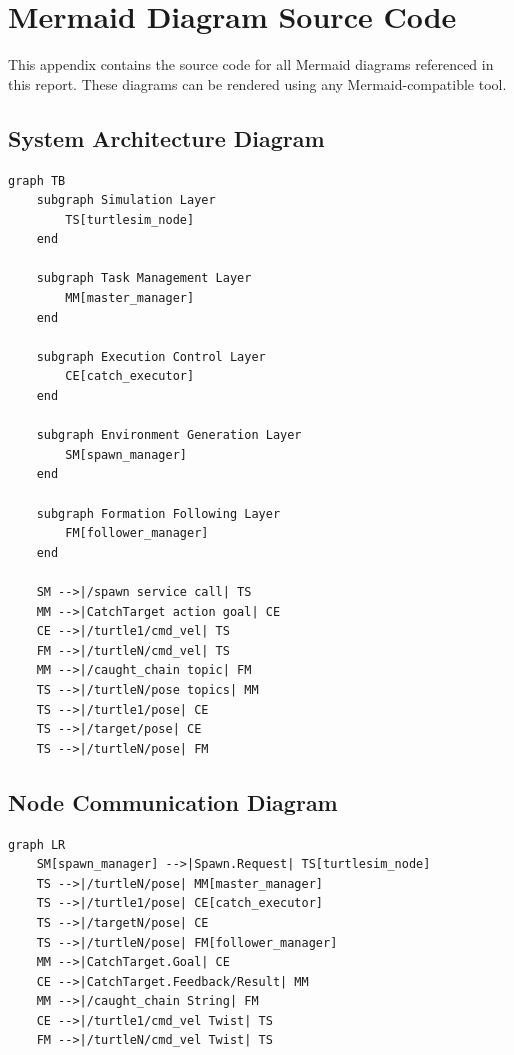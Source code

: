 \chapter{Mermaid Diagram Source Code\label{chap:mermaid}}

This appendix contains the source code for all Mermaid diagrams referenced in this report. These diagrams can be rendered using any Mermaid-compatible tool.

\section{System Architecture Diagram}

\begin{lstlisting}[language={},title={System Architecture}]
graph TB
    subgraph Simulation Layer
        TS[turtlesim_node]
    end

    subgraph Task Management Layer
        MM[master_manager]
    end

    subgraph Execution Control Layer
        CE[catch_executor]
    end

    subgraph Environment Generation Layer
        SM[spawn_manager]
    end

    subgraph Formation Following Layer
        FM[follower_manager]
    end

    SM -->|/spawn service call| TS
    MM -->|CatchTarget action goal| CE
    CE -->|/turtle1/cmd_vel| TS
    FM -->|/turtleN/cmd_vel| TS
    MM -->|/caught_chain topic| FM
    TS -->|/turtleN/pose topics| MM
    TS -->|/turtle1/pose| CE
    TS -->|/target/pose| CE
    TS -->|/turtleN/pose| FM
\end{lstlisting}

\section{Node Communication Diagram}

\begin{lstlisting}[language={},title={Node Communication}]
graph LR
    SM[spawn_manager] -->|Spawn.Request| TS[turtlesim_node]
    TS -->|/turtleN/pose| MM[master_manager]
    TS -->|/turtle1/pose| CE[catch_executor]
    TS -->|/targetN/pose| CE
    TS -->|/turtleN/pose| FM[follower_manager]
    MM -->|CatchTarget.Goal| CE
    CE -->|CatchTarget.Feedback/Result| MM
    MM -->|/caught_chain String| FM
    CE -->|/turtle1/cmd_vel Twist| TS
    FM -->|/turtleN/cmd_vel Twist| TS
\end{lstlisting}

